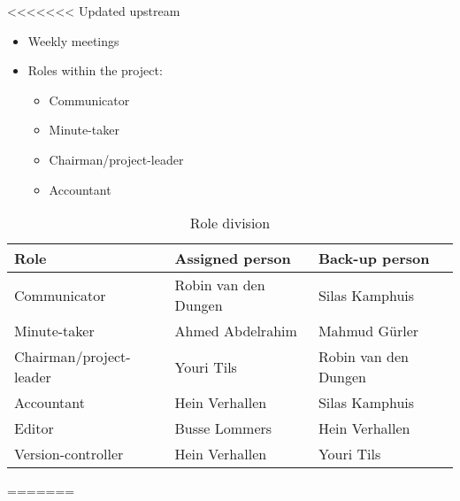 <<<<<<< Updated upstream
\begin{itemize}
    \setlength\itemsep{-0.3em}
    \item Weekly meetings
    \item Roles within the project:
    \begin{itemize}
        \setlength\itemsep{-0.3em}
        \item Communicator
        \item Minute-taker
        \item Chairman/project-leader
        \item Accountant\\
    \end{itemize}
\end{itemize}

\begin{table}[!h]
    \begin{tabular}{|l|l|l|}
        \hline
        \textbf{Role} & \textbf{Assigned person} & \textbf{Back-up person}\\ \hline
        Communicator & Robin van den Dungen & Silas Kamphuis\\ \hline
        Minute-taker & Ahmed Abdelrahim & Mahmud Gürler\\ \hline
        Chairman/project-leader & Youri Tils & Robin van den Dungen\\ \hline
        Accountant & Hein Verhallen & Silas Kamphuis\\ \hline
        Editor & Busse Lommers & Hein Verhallen\\ \hline
        Version-controller & Hein Verhallen & Youri Tils\\ \hline
    \end{tabular}
    \caption{Role division}
\end{table}
=======
